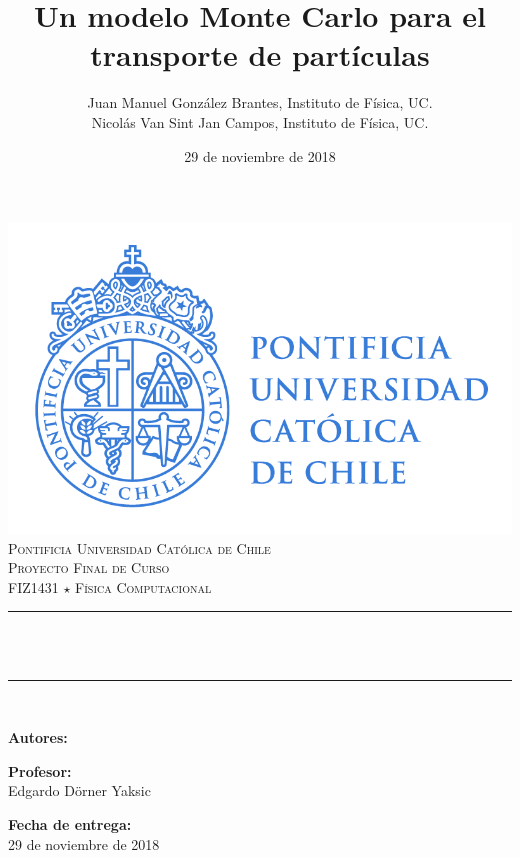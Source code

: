 \documentclass[12pt]{article}
\title{Un modelo Monte Carlo para el transporte de partículas} %
\author{\normalsize Juan Manuel González Brantes, Instituto de Física, UC. \\
Nicolás Van Sint Jan Campos, Instituto de Física, UC.} %
\date{29 de noviembre de 2018} %
\makeatletter
\let\thetitle\@title
\let\theauthor\@author
\makeatother
\begin{document}

\begin{titlepage}
	\centering
    \vspace*{-2.5 cm}
    \includegraphics[scale = 0.95]{uc.png} \\ [0.5 cm]								
    \textsc{\Large Pontificia Universidad Católica de Chile} \\ [1.0 cm]
	\textsc{\large Proyecto Final de Curso} \\ [0.5 cm]																
	\textsc{\large FIZ1431 $\star$ Física Computacional} \\ [0.5 cm]									
	\rule{\linewidth}{0.2 mm} \\ [0.4 cm]
	{ \huge \bfseries \thetitle} \\
	\rule{\linewidth}{0.2 mm} \\ [1.0 cm]
	
	\begin{minipage}{0.4\textwidth}
		\begin{center} \large
			\textbf{\textsf{Autores:}} \\
			\theauthor\linebreak
			
			\textbf{\textsf{\large Profesor:}} \\
			Edgardo Dörner Yaksic \linebreak
			
			\textbf{\textsf{\large Fecha de entrega:}} \\
			29 de noviembre de 2018 \linebreak
			\end{center}
	\end{minipage}\\[2 cm]
	 
	\vfill
	
\end{titlepage}
\end{document}

